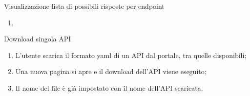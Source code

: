 \begin{usecase}{6}{Visualizzazione lista di possibili risposte per endpoint}\label{uc:}
    \usecasepre{}
    \usecasedesc{}
    \usecasepost{}

    \usecasemain{}
        \begin{enumerate}
            \item 
        \end{enumerate}


\end{usecase}


\begin{usecase}{7}{Download singola API}\label{uc:download-singola-api}

    \usecasemain{}
        \begin{enumerate}
            \item L'utente scarica il formato yaml di un API dal portale, tra quelle disponibili;
            \item Una nuova pagina si apre e il download dell'API viene eseguito;
            \item Il nome del file è già impostato con il nome dell'API scaricata.
        \end{enumerate}

\end{usecase}


